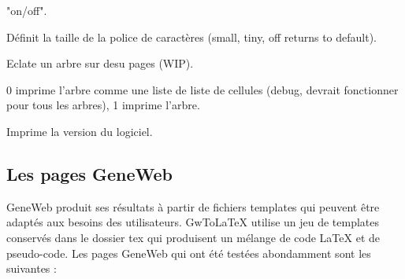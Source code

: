 \begin{description}[style=nextline]
\item["Arbres"/"Trees"] "on/off".
\item["FontSize"] Définit la taille de la police de caractères\label{fontsize}
(small, tiny, off returns to default).
\item["TwoPages"] Eclate un arbre sur desu pages (WIP).
\item["TreeMode"] 0 imprime l'arbre comme une liste de liste de cellules
(debug, devrait fonctionner pour tous les arbres), 1 imprime l'arbre.

\item["Version"] Imprime la version du logiciel.
\end{description}

\subsection{Les pages GeneWeb}

GeneWeb produit ses résultats à partir de fichiers templates qui peuvent être
adaptés aux besoins des utilisateurs.
GwToLaTeX utilise un jeu de templates conservés dans le dossier tex qui
produisent un mélange de code LaTeX et de pseudo-code.
Les pages GeneWeb qui ont été testées abondamment sont les suivantes :

